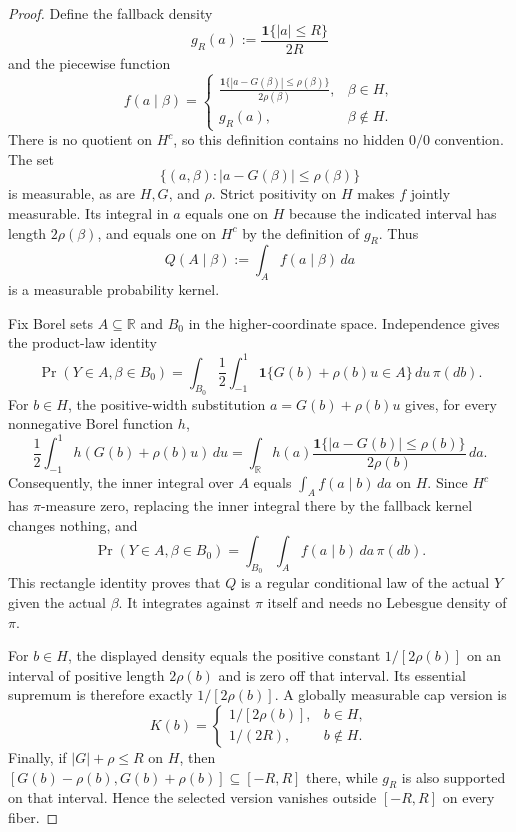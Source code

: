 \begin{proof}
Define the fallback density
\[
g_R(a):=\frac{\mathbf1\{|a|\leq R\}}{2R}
\]
and the piecewise function
\[
f(a\mid\beta)=
\begin{cases}
\displaystyle
\frac{\mathbf1\{|a-G(\beta)|\leq\rho(\beta)\}}
     {2\rho(\beta)},&\beta\in H,\\[8pt]
g_R(a),&\beta\notin H.
\end{cases}
\]
There is no quotient on $H^c$, so this definition contains no hidden
$0/0$ convention.  The set
\[
\{(a,\beta):|a-G(\beta)|\leq\rho(\beta)\}
\]
is measurable, as are $H,G$, and $\rho$.  Strict positivity on $H$
makes $f$ jointly measurable.  Its integral in $a$ equals one on $H$
because the indicated interval has length $2\rho(\beta)$, and equals one
on $H^c$ by the definition of $g_R$.  Thus
\[
Q(A\mid\beta):=\int_A f(a\mid\beta)\,da
\]
is a measurable probability kernel.

Fix Borel sets $A\subseteq\mathbb R$ and $B_0$ in the
higher-coordinate space.  Independence gives the product-law identity
\[
\Pr(Y\in A,\beta\in B_0)
=\int_{B_0}\frac12\int_{-1}^{1}
\mathbf1\{G(b)+\rho(b)u\in A\}\,du\,\pi(db).
\]
For $b\in H$, the positive-width substitution $a=G(b)+\rho(b)u$ gives,
for every nonnegative Borel function $h$,
\[
\frac12\int_{-1}^{1}h(G(b)+\rho(b)u)\,du
=\int_{\mathbb R}h(a)
\frac{\mathbf1\{|a-G(b)|\leq\rho(b)\}}{2\rho(b)}\,da.
\]
Consequently, the inner integral over $A$ equals
$\int_Af(a\mid b)\,da$ on $H$.  Since $H^c$ has $\pi$-measure zero,
replacing the inner integral there by the fallback kernel changes
nothing, and
\[
\Pr(Y\in A,\beta\in B_0)
=\int_{B_0}\int_Af(a\mid b)\,da\,\pi(db).
\]
This rectangle identity proves that $Q$ is a regular conditional law of
the actual $Y$ given the actual $\beta$.  It integrates against $\pi$
itself and needs no Lebesgue density of $\pi$.

For $b\in H$, the displayed density equals the positive constant
$1/[2\rho(b)]$ on an interval of positive length $2\rho(b)$ and is zero
off that interval.  Its essential supremum is therefore exactly
$1/[2\rho(b)]$.  A globally measurable cap version is
\[
K(b)=
\begin{cases}
1/[2\rho(b)],&b\in H,\\
1/(2R),&b\notin H.
\end{cases}
\]
Finally, if $|G|+\rho\leq R$ on $H$, then
$[G(b)-\rho(b),G(b)+\rho(b)]\subseteq[-R,R]$ there, while $g_R$ is also
supported on that interval.  Hence the selected version vanishes outside
$[-R,R]$ on every fiber.
\end{proof}

